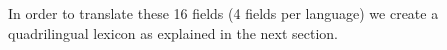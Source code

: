 \documentclass[a4paper,11pt]{article}
\newcommand{\red}[1]{\textcolor{red}{#1}}
\newcommand{\mc}[3]{\multicolumn{#1}{#2}{#3}}
\begin{document}
	In order to translate these 16 fields (4 fields per language) we create a quadrilingual lexicon as explained in the next section.
	
\end{document}
